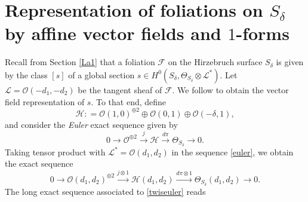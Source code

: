 \documentclass{amsart} %
\theoremstyle{definition}
\newcommand{\cts}{\Theta_{S_{\delta}}}
\newcommand{\mcL}{\mathcal{L}}
\newcommand{\mcO}{\mathcal{O}}
\newcommand{\mcH}{\mathcal{H}}
\begin{document}
\section{Representation of foliations on $ S_{\delta} $ by affine vector fields and $1$-forms}\label{La3}
Recall from Section \ref{La1} that a foliation $\mathcal{F}$ on the Hirzebruch surface $S_\delta$
is given by the class $[s]$ of a global section $ s \in H^{0}( S_{\delta}, \cts \otimes \mcL^{*}) $.
Let $\mathcal L=\mcO(-d_1,-d_2)$ be the tangent sheaf of $\mathcal{F}$. We follow \cite[\S 3.1]{Correa} to obtain the vector field representation of $ s $. To that end, define
\[
 \mcH : = \mcO(1,0)^{\oplus 2} \oplus \mcO(0,1)\oplus \mcO(-\delta,1),
\]
and  consider the \textit{Euler} exact sequence given by
\begin{equation}\label{euler}
0\rightarrow \mcO^{\oplus 2}\xrightarrow{j} \mcH \xrightarrow{d \pi} \cts\rightarrow 0.
\end{equation}
Taking tensor product with $\mcL^* = \mcO(d_1, d_2) $ in the sequence \eqref{euler}, we obtain the exact sequence
\begin{equation}\label{twiseuler}
0\rightarrow {\mcO(d_1, d_2)}^{\oplus 2}
  \xrightarrow{j\otimes 1} \mcH(d_1, d_2)
   \xrightarrow{d \pi\otimes 1} \cts(d_1, d_2)\rightarrow 0.
\end{equation}
The long exact sequence associated to \eqref{twiseuler} reads
\end{document}
